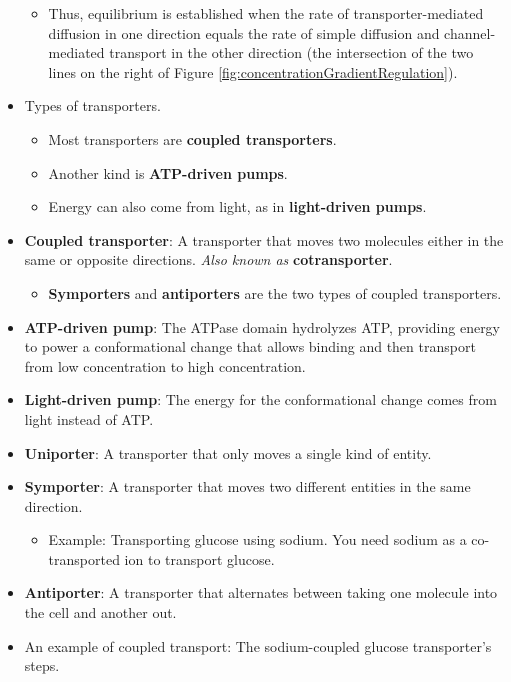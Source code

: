 \documentclass[../notes.tex]{subfiles}
\begin{document}
\begin{itemize}
\begin{itemize}
        \item Thus, equilibrium is established when the rate of transporter-mediated diffusion in one direction equals the rate of simple diffusion and channel-mediated transport in the other direction (the intersection of the two lines on the right of Figure \ref{fig:concentrationGradientRegulation}).
    \end{itemize}
    \item Types of transporters.
    \begin{itemize}
        \item Most transporters are \textbf{coupled transporters}.
        \item Another kind is \textbf{ATP-driven pumps}.
        \item Energy can also come from light, as in \textbf{light-driven pumps}.
    \end{itemize}
    \item \textbf{Coupled transporter}: A transporter that moves two molecules either in the same or opposite directions. \emph{Also known as} \textbf{cotransporter}.
    \begin{itemize}
        \item \textbf{Symporters} and \textbf{antiporters} are the two types of coupled transporters.
    \end{itemize}
    \item \textbf{ATP-driven pump}: The ATPase domain hydrolyzes ATP, providing energy to power a conformational change that allows binding and then transport from low concentration to high concentration.
    \item \textbf{Light-driven pump}: The energy for the conformational change comes from light instead of ATP.
    \item \textbf{Uniporter}: A transporter that only moves a single kind of entity.
    \item \textbf{Symporter}: A transporter that moves two different entities in the same direction.
    \begin{itemize}
        \item Example: Transporting glucose using sodium. You need sodium as a co-transported ion to transport glucose.
    \end{itemize}
    \item \textbf{Antiporter}: A transporter that alternates between taking one molecule into the cell and another out.
    \item An example of coupled transport: The sodium-coupled glucose transporter's steps.

\end{itemize}
\end{document}
